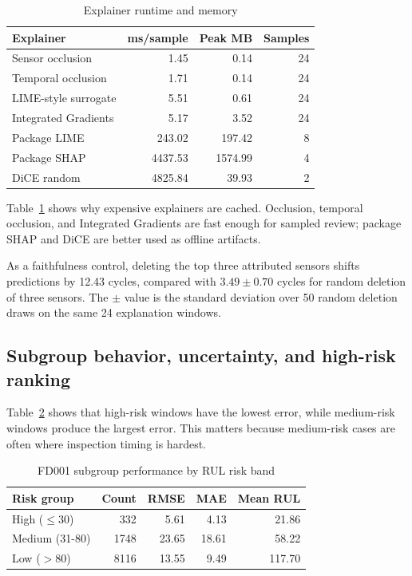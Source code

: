\documentclass[conference]{IEEEtran}
\begin{document}
\begin{table}[!t]
\caption{Explainer runtime and memory}
\label{tab:runtime}
\centering
\scriptsize
\begin{tabular}{lrrr}
\toprule
Explainer & ms/sample & Peak MB & Samples \\
\midrule
Sensor occlusion & 1.45 & 0.14 & 24 \\
Temporal occlusion & 1.71 & 0.14 & 24 \\
LIME-style surrogate & 5.51 & 0.61 & 24 \\
Integrated Gradients & 5.17 & 3.52 & 24 \\
Package LIME & 243.02 & 197.42 & 8 \\
Package SHAP & 4437.53 & 1574.99 & 4 \\
DiCE random & 4825.84 & 39.93 & 2 \\
\bottomrule
\end{tabular}
\end{table}

Table~\ref{tab:runtime} shows why expensive explainers are cached. Occlusion, temporal occlusion, and Integrated Gradients are fast enough for sampled review; package SHAP and DiCE are better used as offline artifacts.

As a faithfulness control, deleting the top three attributed sensors shifts predictions by 12.43 cycles, compared with \(3.49 \pm 0.70\) cycles for random deletion of three sensors. The \(\pm\) value is the standard deviation over 50 random deletion draws on the same 24 explanation windows.

\subsection{Subgroup behavior, uncertainty, and high-risk ranking}
Table~\ref{tab:subgroup} shows that high-risk windows have the lowest error, while medium-risk windows produce the largest error. This matters because medium-risk cases are often where inspection timing is hardest.

\begin{table}[!t]
\caption{FD001 subgroup performance by RUL risk band}
\label{tab:subgroup}
\centering
\scriptsize
\begin{tabular}{lrrrr}
\toprule
Risk group & Count & RMSE & MAE & Mean RUL \\
\midrule
High (\(\leq 30\)) & 332 & 5.61 & 4.13 & 21.86 \\
Medium (31-80) & 1748 & 23.65 & 18.61 & 58.22 \\
Low (\(>80\)) & 8116 & 13.55 & 9.49 & 117.70 \\
\bottomrule
\end{tabular}
\end{table}
\end{document}
